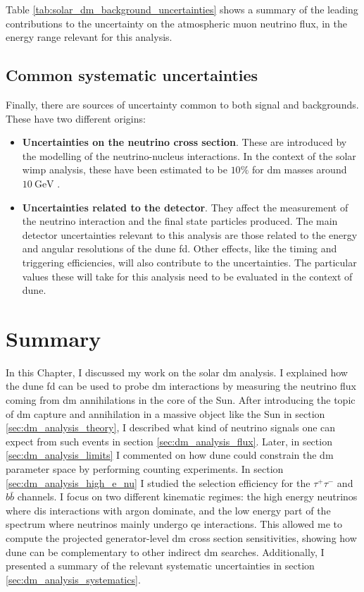 Table \ref{tab:solar_dm_background_uncertainties} shows a summary of the leading contributions to the uncertainty on the atmospheric muon neutrino flux, in the energy range relevant for this analysis.

\subsection{Common systematic uncertainties}

Finally, there are sources of uncertainty common to both signal and backgrounds. These have two different origins:

\begin{itemize}
	\item \textbf{Uncertainties on the neutrino cross section}. These are introduced by the modelling of the neutrino-nucleus interactions. In the context of the solar \gls{wimp} analysis, these have been estimated to be $10\%$ for \gls{dm} masses around $10~\mathrm{GeV}$ \cite{Boliev2013}.
	\item \textbf{Uncertainties related to the detector}. They affect the measurement of the neutrino interaction and the final state particles produced. The main detector uncertainties relevant to this analysis are those related to the energy and angular resolutions of the \gls{dune} \gls{fd}. Other effects, like the timing and triggering efficiencies, will also contribute to the uncertainties. The particular values these will take for this analysis need to be evaluated in the context of \gls{dune}.
\end{itemize}

\section{Summary}

In this Chapter, I discussed my work on the solar \gls{dm} analysis. I explained how the \gls{dune} \gls{fd} can be used to probe \gls{dm} interactions by measuring the neutrino flux coming from \gls{dm} annihilations in the core of the Sun. After introducing the topic of \gls{dm} capture and annihilation in a massive object like the Sun in section \ref{sec:dm_analysis_theory}, I described what kind of neutrino signals one can expect from such events in section \ref{sec:dm_analysis_flux}. Later, in section \ref{sec:dm_analysis_limits} I commented on how \gls{dune} could constrain the \gls{dm} parameter space by performing counting experiments. In section \ref{sec:dm_analysis_high_e_nu} I studied the selection efficiency for the $\tau^{+}\tau^{-}$ and $b\bar{b}$ channels. I focus on two different kinematic regimes: the high energy neutrinos where \gls{dis} interactions with argon dominate, and the low energy part of the spectrum where neutrinos mainly undergo \gls{qe} interactions. This allowed me to compute the projected generator-level \gls{dm} cross section sensitivities, showing how \gls{dune} can be complementary to other indirect \gls{dm} searches. Additionally, I presented a summary of the relevant systematic uncertainties in section \ref{sec:dm_analysis_systematics}.